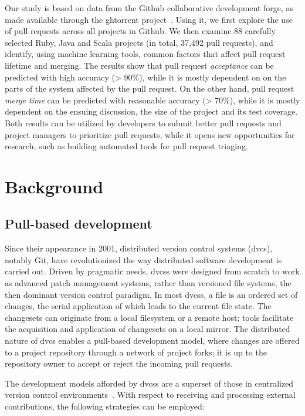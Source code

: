 \documentclass{acm_proc_article-sp}
\begin{document}
Our study is based on data from the Github collaborative development forge, as
made available through the {\sc ght}orrent project~\cite{GS12}. Using it, we first
explore the use of pull requests across all projects in Github. We then examine
88 carefully selected Ruby, Java and Scala projects (in total, 37,492 pull requests), and
identify, using machine learning tools, common factors that affect pull request
lifetime and merging. The results show that pull request \emph{acceptance}
can be predicted with high accuracy (> 90\%), while it is mostly dependent on
on the parts of the system affected by the pull request. On the other hand, pull
request \emph{merge time} can be predicted with reasonable accuracy (> 70\%),
while it is mostly dependent on the ensuing discussion, the size of the project
and its test coverage. Both results can be utilized by developers to
submit better pull requests and project managers to prioritize pull requests, while
it opens new opportunities for research, such as building automated tools for
pull request triaging.

\section{Background} \label{sec:bg}
\subsection{Pull-based development}

Since their appearance in 2001, distributed
version control systems ({\sc dvcs}), notably Git, have revolutionized the way
distributed software development is carried out. Driven by pragmatic needs, {\sc
dvcs}s were designed from scratch to work as advanced patch management
systems, rather than versioned file systems, the then dominant version control
paradigm. In most {\sc dvcs}s, a file is an ordered set of changes, the serial
application of which leads to the current file state. The changesets can
originate from a local filesystem or a remote host; tools facilitate the
acquisition and application of changesets on a local mirror. The distributed
nature of {\sc dvcs} enables a pull-based development model, where changes are
offered to a project repository through a network of project forks; it is up to
the repository owner to accept or reject the incoming pull requests.

The development models afforded by {\sc dvcs}s are a superset of 
those in centralized version control environments~\cite{Shiha12,Bird09}. 
With respect to receiving and processing external contributions,
the following strategies can be employed:
\end{document}
